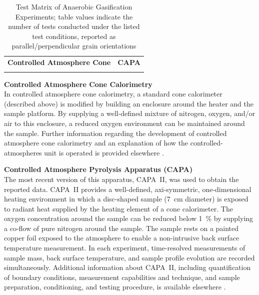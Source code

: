 \documentclass{book}
\begin{document}
\begin{table}[ht]
	\caption{Test Matrix of Anaerobic Gasification Experiments; table values indicate the number of tests conducted under the listed test conditions, reported as parallel/perpendicular grain orientations}
	\label{Table:Gasification_Matrix}
	\begin{center}
		\begin{tabular}{cc}
			\textbf{Controlled Atmosphere Cone} & \textbf{CAPA} \\
			\begin{minipage}{0.45\textwidth}
				\centering
				
			\end{minipage}
			&
			\begin{minipage}{0.45\textwidth}
				\centering
				
			\end{minipage}
		\end{tabular}
	\end{center}
\end{table}



\textbf{Controlled Atmosphere Cone Calorimetry}\\
In controlled atmosphere cone calorimetry, a standard cone calorimeter (described above) is modified by building an enclosure around the heater and the sample platform. By supplying a well-defined mixture of nitrogen, oxygen, and/or air to this enclosure, a reduced oxygen environment can be maintained around the sample. Further information regarding the development of controlled atmosphere cone calorimetry and an explanation of how the controlled‐atmospheres unit is operated is provided elsewhere \cite{babrauskas1992cone}.

\textbf{Controlled Atmosphere Pyrolysis Apparatus (CAPA)}\\
The most recent version of this apparatus, CAPA~II, was used to obtain the reported data. CAPA~II provides a well-defined, axi-symmetric, one-dimensional heating environment in which a disc-shaped sample (7~cm diameter) is exposed to radiant heat supplied by the heating element of a cone calorimeter. The oxygen concentration around the sample can be reduced below 1~\% by supplying a co-flow of pure nitrogen around the sample. The sample rests on a painted copper foil exposed to the atmosphere to enable a non-intrusive back surface temperature measurement. In each experiment, time-resolved measurements of sample mass, back surface temperature, and sample profile evolution are recorded simultaneously. Additional information about CAPA~II, including quantification of boundary conditions, measurement capabilities and technique, and sample preparation, conditioning, and testing procedure, is available elsewhere \cite{swann2017controlled}.
\end{document}
